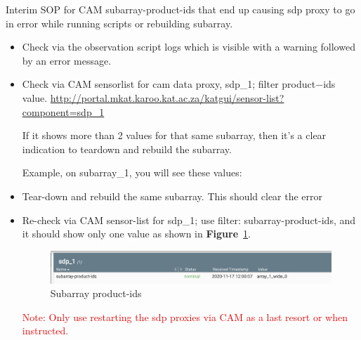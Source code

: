  Interim SOP for CAM subarray-product-ids that end up causing sdp proxy to go in error while running scripts or rebuilding subarray.
\begin{itemize}


 	\item{} Check via the observation script logs which is visible with a warning followed by an error message.

 
	\item{} Check via CAM sensor\-list for cam data proxy, sdp\_1; filter product$-$ids value. 
\url{http://portal.mkat.karoo.kat.ac.za/katgui/sensor-list?component=sdp\_1}

If it shows more than 2 values for that same subarray, then it's a clear indication to teardown and rebuild the subarray.

Example, on subarray\_1, you will see these values: 


\item{} Tear-down and rebuild the same subarray.  This should clear the error
\item{} Re-check via CAM sensor-list for sdp\_1; use filter: subarray-product-ids, and it should show only one value as shown in \textbf{Figure}~\ref{fig:image43}.


\begin{figure}[!thb]
	\centering
	\includegraphics[scale=0.7]{Chapters/images/image43.png}
	
	\caption{Subarray product-ids}
	\label{fig:image43}
\end{figure}

\textcolor{red}{Note: Only use restarting the sdp proxies via CAM as a last resort or when instructed.}
\end{itemize}

